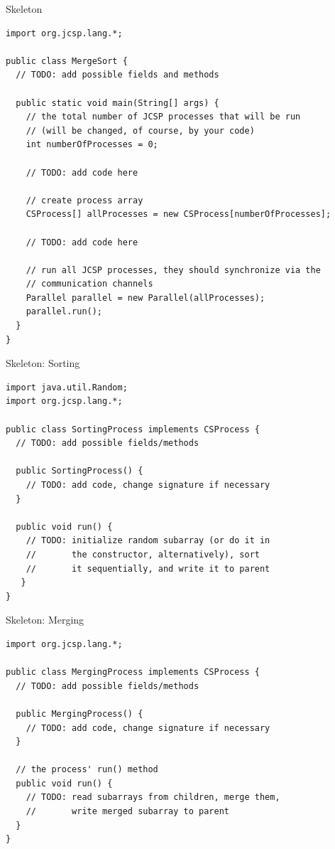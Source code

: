 \begin{frame}[fragile]{Skeleton}
\begin{lstlisting}[basicstyle=\fontsize{7}{9}\selectfont\ttfamily]
import org.jcsp.lang.*;

public class MergeSort {
  // TODO: add possible fields and methods
  
  public static void main(String[] args) {
    // the total number of JCSP processes that will be run 
    // (will be changed, of course, by your code)
    int numberOfProcesses = 0;
    
    // TODO: add code here
    
    // create process array
    CSProcess[] allProcesses = new CSProcess[numberOfProcesses];
    
    // TODO: add code here
    
    // run all JCSP processes, they should synchronize via the 
    // communication channels
    Parallel parallel = new Parallel(allProcesses);
    parallel.run();
  }
}
\end{lstlisting}
\end{frame}

\begin{frame}[fragile]{Skeleton: Sorting}
\begin{lstlisting}[basicstyle=\fontsize{9}{11}\selectfont\ttfamily]
import java.util.Random;
import org.jcsp.lang.*;

public class SortingProcess implements CSProcess {
  // TODO: add possible fields/methods
  
  public SortingProcess() {
    // TODO: add code, change signature if necessary
  }
    
  public void run() {
    // TODO: initialize random subarray (or do it in
    //       the constructor, alternatively), sort
    //       it sequentially, and write it to parent
   }
}
\end{lstlisting}
\end{frame}

\begin{frame}[fragile]{Skeleton: Merging}
\begin{lstlisting}[basicstyle=\fontsize{9}{11}\selectfont\ttfamily]
import org.jcsp.lang.*;

public class MergingProcess implements CSProcess {
  // TODO: add possible fields/methods
  
  public MergingProcess() {
    // TODO: add code, change signature if necessary
  }
  
  // the process' run() method
  public void run() {
    // TODO: read subarrays from children, merge them, 
    //       write merged subarray to parent
  }
}
\end{lstlisting}
\end{frame}


